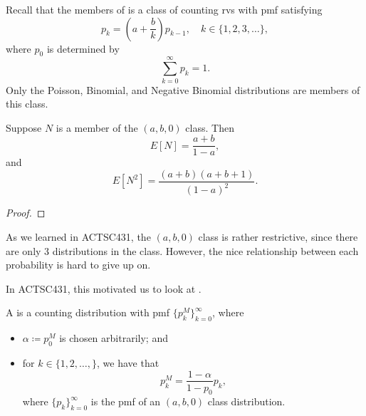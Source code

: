 \documentclass[notoc,notitlepage]{tufte-book}
\begin{document}
Recall that the members of 
is a class of counting rvs with pmf satisfying
\begin{equation*}
  p_k = \left( a + \frac{b}{k} \right) p_{k-1}, \quad k \in \{ 1, 2, 3, \ldots
  \},
\end{equation*}
where $p_0$ is determined by
\begin{equation*}
  \sum_{k=0}^{\infty} p_k = 1.
\end{equation*}
Only the Poisson, Binomial, and Negative Binomial distributions
are members of this class.

\begin{propo}\label{propo:first_and_second_moments_of_a_b_0_class}
  Suppose $N$ is a member of the $(a, b, 0)$ class. Then
  \begin{equation*}
    E[N] = \frac{a + b}{1 - a},
  \end{equation*}
  and
  \begin{equation*}
    E[N^2] = \frac{(a+b)(a+b+1)}{(1 - a)^2}.
  \end{equation*}
\end{propo}

\begin{proof}
\end{proof}

As we learned in ACTSC431, the $(a, b, 0)$ class is rather restrictive,
since there are only 3 distributions in the class.
However, the nice relationship between each probability is hard to give up on.

In ACTSC431, this motivated us to look at .

\begin{defn}\label{defn:zero_modified_distribution}
  A  is a counting distribution
  with pmf $\{ p_k^M \}_{k=0}^{\infty}$, where
  \begin{itemize}
    \item $\alpha \coloneqq p_0^M$ is chosen arbitrarily; and
    \item for $k \in \{ 1, 2, \ldots, \}$, we have that
      \begin{equation*}
        p_k^M = \frac{1 - \alpha}{1 - p_0} p_k,
      \end{equation*}
      where $\{ p_k \}_{k=0}^{\infty}$ is the pmf
      of an $(a, b, 0)$ class distribution.
  \end{itemize}
\end{defn}
\end{document}

